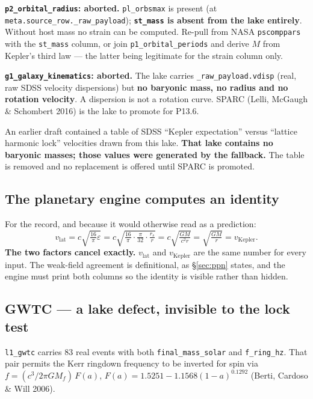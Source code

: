 \documentclass[11pt, letterpaper, openany]{book}
\begin{document}
\begin{warningbox}
\textbf{\texttt{p2\_orbital\_radius}: aborted.} \texttt{pl\_orbsmax} is present (at
\texttt{meta.source\_row.\_raw\_payload}); \textbf{\texttt{st\_mass} is absent from the lake
entirely}. Without host mass no strain can be computed. Re-pull from NASA \texttt{pscomppars} with
the \texttt{st\_mass} column, or join \texttt{p1\_orbital\_periods} and derive $M$ from Kepler's
third law --- the latter being legitimate for the strain column only.

\medskip
\textbf{\texttt{g1\_galaxy\_kinematics}: aborted.} The lake carries
\texttt{\_raw\_payload.vdisp} (real, raw SDSS velocity dispersions) but \textbf{no baryonic mass, no
radius and no rotation velocity}. A dispersion is not a rotation curve. SPARC (Lelli, McGaugh \&
Schombert 2016) is the lake to promote for P13.6.
\end{warningbox}

\begin{correctionbox}
An earlier draft contained a table of SDSS ``Kepler expectation'' versus ``lattice harmonic lock''
velocities drawn from this lake. \textbf{That lake contains no baryonic masses; those values were
generated by the fallback.} The table is removed and no replacement is offered until SPARC is
promoted.
\end{correctionbox}

\subsection*{The planetary engine computes an identity}

For the record, and because it would otherwise read as a prediction:
\[
v_{\text{lat}} = c\sqrt{\tfrac{16}{\pi}\varepsilon}
= c\sqrt{\tfrac{16}{\pi}\cdot\tfrac{\pi}{32}\cdot\tfrac{r_s}{r}}
= c\sqrt{\tfrac{GM}{c^2 r}} = \sqrt{\tfrac{GM}{r}} = v_{\text{Kepler}} .
\]
\textbf{The two factors cancel exactly.} $v_{\text{lat}}$ and $v_{\text{Kepler}}$ are the same
number for every input. The weak-field agreement is definitional, as \S\ref{sec:ppn} states, and the
engine must print both columns so the identity is visible rather than hidden.

\subsection*{GWTC --- a lake defect, invisible to the lock test}

\texttt{l1\_gwtc} carries 83 real events with both \texttt{final\_mass\_solar} and
\texttt{f\_ring\_hz}. That pair permits the Kerr ringdown frequency to be inverted for spin via
$f = (c^3/2\pi GM_f)\,F(a)$, $F(a) = 1.5251 - 1.1568(1-a)^{0.1292}$ (Berti, Cardoso \& Will 2006).
\end{document}
